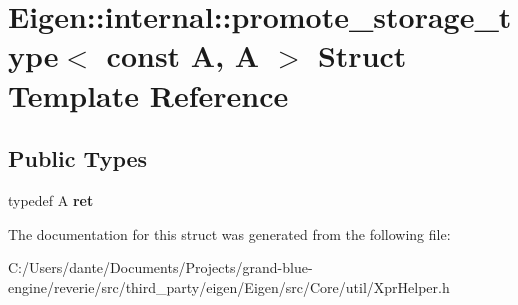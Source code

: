 \hypertarget{struct_eigen_1_1internal_1_1promote__storage__type_3_01const_01_a_00_01_a_01_4}{}\section{Eigen\+::internal\+::promote\+\_\+storage\+\_\+type$<$ const A, A $>$ Struct Template Reference}
\label{struct_eigen_1_1internal_1_1promote__storage__type_3_01const_01_a_00_01_a_01_4}
\subsection*{Public Types}
\begin{DoxyCompactItemize}
\item 
\mbox{\label{struct_eigen_1_1internal_1_1promote__storage__type_3_01const_01_a_00_01_a_01_4_a7135a092ef51abf165d7036c5b74084b}} 
typedef A {\bfseries ret}
\end{DoxyCompactItemize}


The documentation for this struct was generated from the following file\+:\begin{DoxyCompactItemize}
\item 
C\+:/\+Users/dante/\+Documents/\+Projects/grand-\/blue-\/engine/reverie/src/third\+\_\+party/eigen/\+Eigen/src/\+Core/util/Xpr\+Helper.\+h\end{DoxyCompactItemize}
